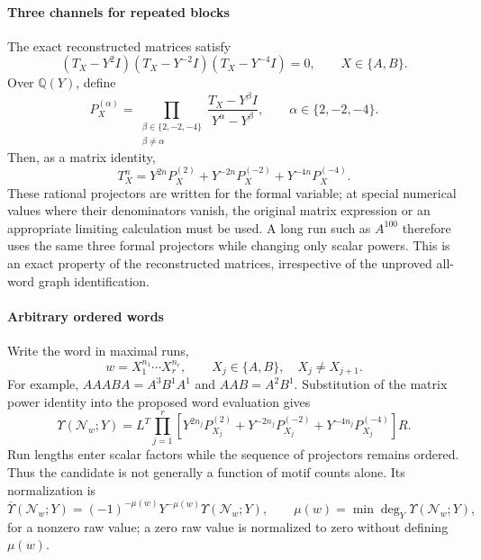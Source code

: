 \paragraph{Three channels for repeated blocks}
\label{supp:transfer_cubic}
The exact reconstructed matrices satisfy
\begin{equation}
\boxed{(T_X-Y^2I)(T_X-Y^{-2}I)(T_X-Y^{-4}I)=0,\qquad X\in\{A,B\}.}
\label{supp:deriv:eq:cubic}
\end{equation}
Over $\mathbb Q(Y)$, define
\begin{equation}
P_X^{(\alpha)}=\prod_{\substack{\beta\in\{2,-2,-4\}\\\beta\neq\alpha}}\frac{T_X-Y^\beta I}{Y^\alpha-Y^\beta},\qquad\alpha\in\{2,-2,-4\}.
\label{supp:deriv:eq:projector_general}
\end{equation}
Then, as a matrix identity,
\begin{equation}
T_X^n=Y^{2n}P_X^{(2)}+Y^{-2n}P_X^{(-2)}+Y^{-4n}P_X^{(-4)}.
\label{supp:deriv:eq:run_power}
\end{equation}
These rational projectors are written for the formal variable; at special numerical values where their denominators vanish, the original matrix expression or an appropriate limiting calculation must be used. A long run such as $A^{100}$ therefore uses the same three formal projectors while changing only scalar powers. This is an exact property of the reconstructed matrices, irrespective of the unproved all-word graph identification.

\paragraph{Arbitrary ordered words}
\label{supp:transfer_ordered_words}
Write the word in maximal runs,
\begin{equation}
w=X_1^{n_1}\cdots X_r^{n_r},\qquad X_j\in\{A,B\},\quad X_j\neq X_{j+1}.
\label{supp:deriv:eq:run_decomp}
\end{equation}
For example, $AAABA=A^3B^1A^1$ and $AAB=A^2B^1$. Substitution of the matrix power identity into the proposed word evaluation gives
\begin{equation}
\boxed{\Upsilon(\mathcal N_w;Y)=L^T\prod_{j=1}^r\left[Y^{2n_j}P_{X_j}^{(2)}+Y^{-2n_j}P_{X_j}^{(-2)}+Y^{-4n_j}P_{X_j}^{(-4)}\right]R.}
\label{supp:deriv:eq:raw_nonabelian_final}
\end{equation}
Run lengths enter scalar factors while the sequence of projectors remains ordered. Thus the candidate is not generally a function of motif counts alone. Its normalization is
\begin{equation}
\overline{\Upsilon}(\mathcal N_w;Y)=(-1)^{-\mu(w)}Y^{-\mu(w)}\Upsilon(\mathcal N_w;Y),\qquad
\mu(w)=\min\deg_Y\Upsilon(\mathcal N_w;Y),
\label{supp:deriv:eq:normalization}
\end{equation}
for a nonzero raw value; a zero raw value is normalized to zero without defining $\mu(w)$.

